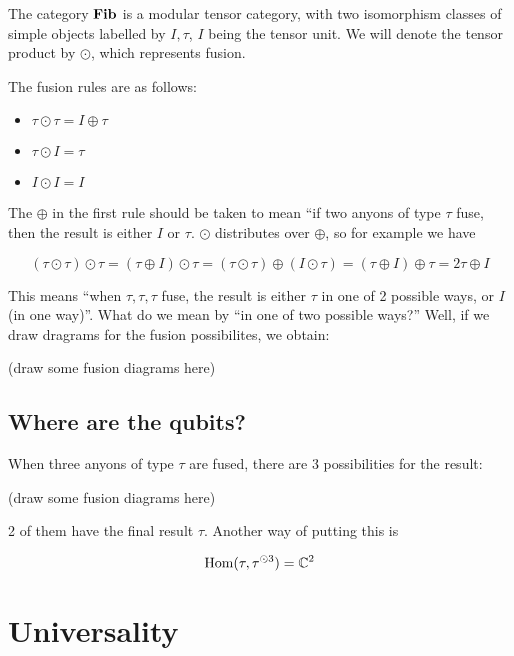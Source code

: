 The category $\mathbf{Fib}$ is a modular tensor category, with two isomorphism classes
of simple objects labelled by $I,\tau$, $I$ being the tensor unit. We will
denote the tensor product by $\odot$, which represents fusion.

The fusion rules are as follows:

\begin{itemize}
    \item $\tau \odot \tau = I \oplus \tau$
    \item $\tau \odot I = \tau$
    \item $I \odot I = I$
\end{itemize}

The $\oplus$ in the first rule should be taken to mean ``if two anyons of type
$\tau$ fuse, then the result is either $I$ or $\tau$. $\odot$ distributes over
$\oplus$, so for example we have 

\begin{equation}
    (\tau \odot \tau) \odot \tau = (\tau \oplus I) \odot \tau = (\tau \odot \tau) \oplus (I \odot \tau) = (\tau \oplus I) \oplus \tau = 2\tau \oplus I
\end{equation}

This means ``when $\tau,\tau,\tau$ fuse, the result is either $\tau$ in one of
2 possible ways, or $I$ (in one way)''. What do we mean by ``in one of two
possible ways?'' Well, if we draw dragrams for the fusion possibilites, we
obtain:

\begin{center}
    (draw some fusion diagrams here)
\end{center}

\subsection{Where are the qubits?}

When three anyons of type $\tau$ are fused, there are 3 possibilities for the result: 

\begin{center}
    (draw some fusion diagrams here)
\end{center}

2 of them have the final result $\tau$. Another way of putting this is 

\begin{equation}
    \operatorname{Hom}(\tau, \tau^{\odot 3}) = \mathbb{C}^2
\end{equation}



\section{Universality}
